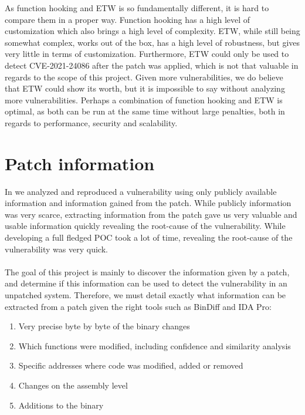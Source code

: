 \documentclass{report}
\begin{document}
As function hooking and \gls{ETW} is so fundamentally different, it is hard to compare them in a proper way. Function hooking has a high level of customization which also brings a high level of complexity. \gls{ETW}, while still being somewhat complex, works out of the box, has a high level of robustness, but gives very little in terms of customization. Furthermore, \gls{ETW} could only be used to detect CVE-2021-24086 after the patch was applied, which is not that valuable in regards to the scope of this project. Given more vulnerabilities, we do believe that \gls{ETW} could show its worth, but it is impossible to say without analyzing more vulnerabilities. Perhaps a combination of function hooking and \gls{ETW} is optimal, as both can be run at the same time without large penalties, both in regards to performance, security and scalability.

\section{Patch information}
In  we analyzed and reproduced a vulnerability using only publicly available information and information gained from the patch. While publicly information was very scarce, extracting information from the patch gave us very valuable and usable information quickly revealing the root-cause of the vulnerability. While developing a full fledged \gls{POC} took a lot of time, revealing the root-cause of the vulnerability was very quick.
\\
\\
The goal of this project is mainly to discover the information given by a patch, and determine if this information can be used to detect the vulnerability in an unpatched system. Therefore, we must detail exactly what information can be extracted from a patch given the right tools such as BinDiff\cite{url:bindiff:homepage} and IDA Pro\cite{url:ida-pro:homepage}:

\begin{enumerate}
    \item Very precise byte by byte of the binary changes
    \item Which functions were modified, including confidence and similarity analysis
    \item Specific addresses where code was modified, added or removed
    \item Changes on the assembly level
    \item Additions to the binary
\end{enumerate}
\end{document}
